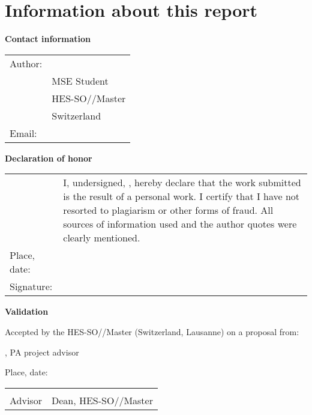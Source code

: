 \chapter*{Information about this report}

\vspace{\fill}

\textbf{Contact information}

\begin{tabularx}{\textwidth}{N{2.5cm}X}
	Author:	 & \Author \\
	& MSE Student \\
	& HES-SO//Master \\
	& Switzerland \\
	Email: & \email{\AuthorEmail}
\end{tabularx}

\vspace{\fill}

\textbf{Declaration of honor}

{\renewcommand{\arraystretch}{2}
\begin{tabularx}{\textwidth}{N{2.5cm}X}
	& I, undersigned, \Author, hereby declare that the work submitted is 
	the result of a personal work. I certify that I have not resorted to 
	plagiarism or other forms of fraud. All sources of information used and the 
	author quotes were clearly mentioned. \\
	Place, date: & \underline{\hspace{7cm}} \\ 
	Signature: & \underline{\hspace{7cm}}
\end{tabularx}
}

\vspace{\fill}

\textbf{Validation}

Accepted by the HES-SO//Master (Switzerland, Lausanne) on a proposal from:

\vspace{0.5cm}

\Advisor, PA project advisor


\vspace{1cm}

Place, date: \underline{\hspace{8cm}}

\vspace{3cm}

{ \renewcommand{\arraystretch}{1.5}
\begin{tabularx}{\textwidth}{X X}
	\Advisor  & \Dean\\ 
	Advisor   & Dean, HES-SO//Master\\
\end{tabularx}
}